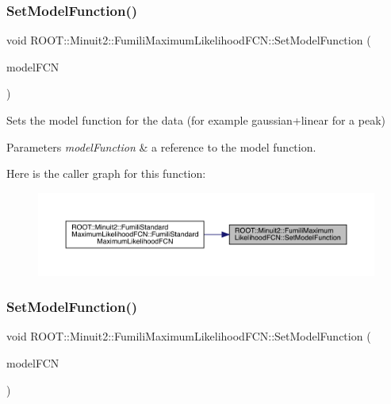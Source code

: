 \subsubsection{\texorpdfstring{SetModelFunction()}{SetModelFunction()}\hspace{0.1cm}{\footnotesize\ttfamily [1/2]}}
{\footnotesize\ttfamily void R\+O\+O\+T\+::\+Minuit2\+::\+Fumili\+Maximum\+Likelihood\+F\+C\+N\+::\+Set\+Model\+Function (\begin{DoxyParamCaption}\item[{const \mbox{\hyperlink{classROOT_1_1Minuit2_1_1ParametricFunction}{Parametric\+Function}} \&}]{model\+F\+CN }\end{DoxyParamCaption})\hspace{0.3cm}{\ttfamily [inline]}}

Sets the model function for the data (for example gaussian+linear for a peak)


\begin{DoxyParams}{Parameters}
{\em model\+Function} & a reference to the model function. \\
\hline
\end{DoxyParams}
Here is the caller graph for this function\+:\nopagebreak
\begin{figure}[H]
\begin{center}
\leavevmode
\includegraphics[width=350pt]{dd/d54/classROOT_1_1Minuit2_1_1FumiliMaximumLikelihoodFCN_a1aef27a37fc3a8df63aed6aff19c0c33_icgraph}
\end{center}
\end{figure}
\mbox{\label{classROOT_1_1Minuit2_1_1FumiliMaximumLikelihoodFCN_a1aef27a37fc3a8df63aed6aff19c0c33}} 
\subsubsection{\texorpdfstring{SetModelFunction()}{SetModelFunction()}\hspace{0.1cm}{\footnotesize\ttfamily [2/2]}}
{\footnotesize\ttfamily void R\+O\+O\+T\+::\+Minuit2\+::\+Fumili\+Maximum\+Likelihood\+F\+C\+N\+::\+Set\+Model\+Function (\begin{DoxyParamCaption}\item[{const \mbox{\hyperlink{classROOT_1_1Minuit2_1_1ParametricFunction}{Parametric\+Function}} \&}]{model\+F\+CN }\end{DoxyParamCaption})\hspace{0.3cm}{\ttfamily [inline]}}

